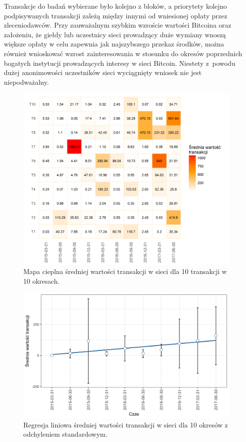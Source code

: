 \documentclass[12pt, twoside, final, openany]{mgr}
\newcommand{\chartsWidth}{0.8}
\begin{document}
\indent Transakcje do badań wybierane było kolejno z bloków, a priorytety kolejno podpisywanych transakcji zależą między innymi od wniesionej opłaty przez zleceniodawców. Przy zauważalnym szybkim wzroście wartości Bitcoina oraz założeniu, że giełdy lub uczestnicy sieci prowadzący duże wymiany wnoszą większe opłaty w celu zapewnia jak najszybszego przekaz środków, można również wnioskować wzrost zainteresowania w stosunku do okresów poprzednich bogatych instytucji prowadzących interesy w sieci Bitcoin. Niestety z~powodu dużej anonimowości uczestników sieci wyciągnięty wniosek nie jest niepodważalny.

\begin{figure}[H]
\centering
   \includegraphics[width=\chartsWidth\linewidth]{pictures/wartosc_transakcji/wartosc_transakcji_hm.png}
   \caption{Mapa cieplna średniej wartości transakcji w sieci dla 10 transakcji w 10 okresach.}
   \label{fig:wt1} 
\end{figure}
\begin{figure}[H]
\centering
   \includegraphics[width=\chartsWidth\linewidth]{pictures/wartosc_transakcji/wartosc_transakcji_sda.png}
   \caption{Regresja liniowa średniej wartości transakcji w sieci dla 10 okresów z odchyleniem standardowym.}
   \label{fig:wt2}
\end{figure}
\end{document}
